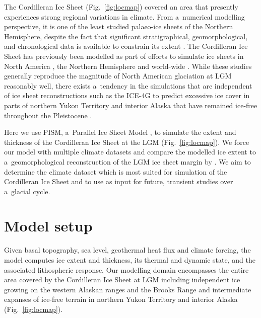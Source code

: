 \documentclass[tc, ms]{copernicus}
\begin{document}
The Cordilleran Ice Sheet (Fig.~\ref{fig:locmap}) covered an area that presently experiences strong regional variations in climate. From a~numerical modelling perspective, it is one of the least studied palaeo-ice sheets of the Northern Hemisphere, despite the fact that significant stratigraphical, geomorphological, and chronological data is available to constrain its extent \citep{jackson-clague-1991,porter-swanson-1998,dukrodkin-1999,dyke-2004,kaufman-manley-2004,kleman-etal-2010,stroeven-etal-2010,stroeven-etal-inpress,margold-etal-2011}. The Cordilleran Ice Sheet has previously been modelled as part of efforts to simulate ice sheets in North America \citep{marshall-clarke-1999,calov-etal-2002,tarasov-peltier-1997,tarasov-peltier-2004,gregoire-etal-2012}, the Northern Hemisphere \citep{huybrechts-tsiobbel-1996,greve-etal-1999,charbit-etal-2002,charbit-etal-2007,charbit-etal-2013,johnson-fastook-2002,rodgers-etal-2004,bintanja-etal-2005,zweck-huybrechts-2005,abeouchi-etal-2007} and world-wide \citep{yoshimori-etal-2001}. While these studies generally reproduce the magnitude of North American glaciation at LGM reasonably well, there exists a~tendency in the simulations that are independent of ice sheet reconstructions such as the ICE-4G to predict excessive ice cover in parts of northern Yukon Territory and interior Alaska that have remained ice-free throughout the Pleistocene \citep{dukrodkin-1999,kaufman-manley-2004}.

Here we use PISM, a~Parallel Ice Sheet Model \citep{web:pism}, to simulate the extent and thickness of the Cordilleran Ice Sheet at the LGM (Fig.~\ref{fig:locmap}). We force our model with multiple climate datasets and compare the modelled ice extent to a~geomorphological reconstruction of the LGM ice sheet margin by \citet{dyke-2004}. We aim to determine the climate dataset which is most suited for simulation of the Cordilleran Ice Sheet and to use as input for future, transient studies over a~glacial cycle.

\section{Model setup}
\label{sec:model}

Given basal topography, sea level, geothermal heat flux and climate forcing, the model computes ice extent and thickness, its thermal and dynamic state, and the associated lithospheric response. Our modelling domain encompasses the entire area covered by the Cordilleran Ice Sheet at LGM including independent ice growing on the western Alaskan ranges and the Brooks Range and intermediate expanses of ice-free terrain in northern Yukon Territory and interior Alaska (Fig.~\ref{fig:locmap}).
\end{document}
